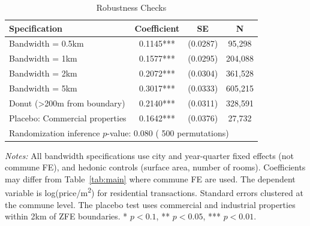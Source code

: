 \begin{table}[htbp]
\centering
\caption{Robustness Checks}
\label{tab:robustness}
\begin{tabular}{lccc}
\hline\hline
Specification & Coefficient & SE & N \\
\hline
Bandwidth = 0.5km  &  0.1145***  &  (0.0287)  &  95,298  \\
Bandwidth = 1km  &  0.1577***  &  (0.0295)  &  204,088  \\
Bandwidth = 2km  &  0.2072***  &  (0.0304)  &  361,528  \\
Bandwidth = 5km  &  0.3017***  &  (0.0333)  &  605,215  \\
Donut (>200m from boundary)  &  0.2140***  &  (0.0311)  &  328,591  \\
Placebo: Commercial properties  &  0.1642***  &  (0.0376)  &  27,732  \\
\hline
\multicolumn{4}{l}{Randomization inference $p$-value:  0.080  ( 500  permutations)} \\
\hline\hline
\end{tabular}
\begin{tablenotes}[flushleft]
\small \textit{Notes:} All bandwidth specifications use city and year-quarter fixed effects (not commune FE), and hedonic controls (surface area, number of rooms). Coefficients may differ from Table~\ref{tab:main} where commune FE are used. The dependent variable is log(price/m\textsuperscript{2}) for residential transactions. Standard errors clustered at the commune level. The placebo test uses commercial and industrial properties within 2km of ZFE boundaries. * $p<0.1$, ** $p<0.05$, *** $p<0.01$.
\end{tablenotes}
\end{table}
